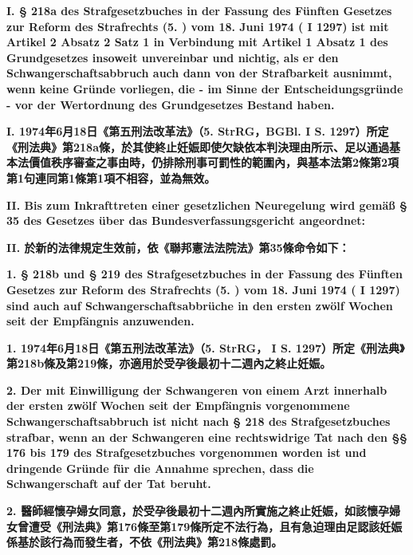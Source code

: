 \documentclass[12pt]{article}
\begin{document}
\syncleft
\begin{sourcepara}
{\bfseries I. § 218a des Strafgesetzbuches in der Fassung des Fünften Gesetzes zur Reform des Strafrechts (5. \abbrStrRG{}) vom 18. Juni 1974 (\abbrBundesgesetzbl{} I \abbrS{} 1297) ist mit Artikel 2 Absatz 2 Satz 1 in Verbindung mit Artikel 1 Absatz 1 des Grundgesetzes insoweit unvereinbar und nichtig, als er den Schwangerschaftsabbruch auch dann von der Strafbarkeit ausnimmt, wenn keine Gründe vorliegen, die - im Sinne der Entscheidungsgründe - vor der Wertordnung des Grundgesetzes Bestand haben.}
\end{sourcepara}
\begin{transpara}
{\bfseries I. 1974年6月18日《第五刑法改革法》（5. StrRG，BGBl. I S. 1297）所定《刑法典》第218a條，於其使終止妊娠即使欠缺依本判決理由所示、足以通過基本法價值秩序審查之事由時，仍排除刑事可罰性的範圍內，與基本法第2條第2項第1句連同第1條第1項不相容，並為無效。}
\end{transpara}

\syncleft
\begin{sourcepara}
{\bfseries II. Bis zum Inkrafttreten einer gesetzlichen Neuregelung wird gemäß § 35 des Gesetzes über das Bundesverfassungsgericht angeordnet:}
\end{sourcepara}
\begin{transpara}
{\bfseries II. 於新的法律規定生效前，依《聯邦憲法法院法》第35條命令如下：}
\end{transpara}

\syncleft
\begin{sourcepara}
{\bfseries 1. § 218b und § 219 des Strafgesetzbuches in der Fassung des Fünften Gesetzes zur Reform des Strafrechts (5. \abbrStrRG{}) vom 18. Juni 1974 (\abbrBundesgesetzbl{} I \abbrS{} 1297) sind auch auf Schwangerschaftsabbrüche in den ersten zwölf Wochen seit der Empfängnis anzuwenden.}
\end{sourcepara}
\begin{transpara}
{\bfseries 1. 1974年6月18日《第五刑法改革法》（5. StrRG，\abbrBundesgesetzbl{} I S. 1297）所定《刑法典》第218b條及第219條，亦適用於受孕後最初十二週內之終止妊娠。}
\end{transpara}

\syncleft
\begin{sourcepara}
{\bfseries 2. Der mit Einwilligung der Schwangeren von einem Arzt innerhalb der ersten zwölf Wochen seit der Empfängnis vorgenommene Schwangerschaftsabbruch ist nicht nach § 218 des Strafgesetzbuches strafbar, wenn an der Schwangeren eine rechtswidrige Tat nach den §§ 176 bis 179 des Strafgesetzbuches vorgenommen worden ist und dringende Gründe für die Annahme sprechen, dass die Schwangerschaft auf der Tat beruht.}
\end{sourcepara}
\begin{transpara}
{\bfseries 2. 醫師經懷孕婦女同意，於受孕後最初十二週內所實施之終止妊娠，如該懷孕婦女曾遭受《刑法典》第176條至第179條所定不法行為，且有急迫理由足認該妊娠係基於該行為而發生者，不依《刑法典》第218條處罰。}
\end{transpara}
\end{document}
